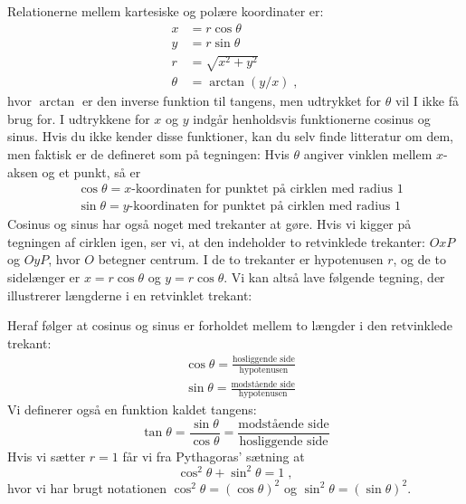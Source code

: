 Relationerne mellem kartesiske og polære koordinater er:
\begin{align*}
  x &= r \cos \theta \\
  y &= r \sin \theta \\
  r &= \sqrt{x^2 + y^2} \\
  \theta &= \arctan (y/x) \; ,
\end{align*}
hvor $\arctan$ er den inverse funktion til tangens, men udtrykket for
$\theta$ vil I ikke få brug for. I udtrykkene for $x$ og $y$ indgår
henholdsvis funktionerne cosinus og sinus. Hvis du ikke kender disse
funktioner, kan du selv finde litteratur om dem, men faktisk er de
defineret som på tegningen: Hvis $\theta$ angiver vinklen mellem
$x$-aksen og et punkt, så er
\begin{align*}
  &\cos \theta = \text{$x$-koordinaten for punktet på cirklen med
    radius $1$}\\
  &\sin \theta = \text{$y$-koordinaten for punktet på cirklen med
    radius $1$}
\end{align*}
Cosinus og sinus har også noget med trekanter at gøre. Hvis vi kigger
på tegningen af cirklen igen, ser vi, at den indeholder to retvinklede
trekanter: $OxP$ og $OyP$, hvor $O$ betegner centrum. I de to
trekanter er hypotenusen $r$, og de to sidelænger er $x = r
\cos\theta$ og $y = r \cos\theta$. Vi kan altså lave følgende tegning,
der illustrerer længderne i en retvinklet trekant:
\begin{center}
\end{center}
Heraf følger at cosinus og sinus er forholdet mellem to længder i den
retvinklede trekant:
\begin{align*}
  &\cos \theta = \frac{\text{hosliggende side}}{\text{hypotenusen}}\\
  &\sin \theta = \frac{\text{modstående side}}{\text{hypotenusen}}
\end{align*}
Vi definerer også en funktion kaldet tangens:
\[
  \tan \theta = \frac{\sin\theta}{\cos\theta}
  = \frac{\text{modstående side}}{\text{hosliggende side}}
\]
Hvis vi sætter $r=1$ får vi fra Pythagoras' sætning at
\begin{equation*}
  \cos^2 \theta + \sin^2 \theta = 1 \; ,
\end{equation*}
hvor vi har brugt notationen $\cos^2 \theta = (\cos\theta)^2$ og
$\sin^2 \theta = (\sin\theta)^2$.


